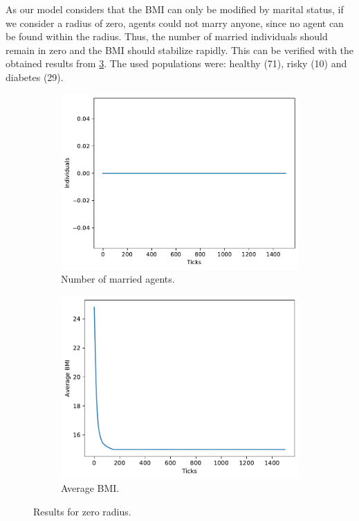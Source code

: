 As our model considers that the BMI can only be modified by marital status, if we consider a radius of zero, agents could not marry anyone, since no agent can be found within the radius. Thus, the number of married individuals should remain in zero and the BMI should stabilize rapidly. This can be verified with the obtained results from \cref{fig:rad0}. The used populations were: healthy (71), risky (10) and diabetes (29).
\begin{figure}[H]
        \centering
        \begin{subfigure}[b]{0.3\columnwidth}
            \centering
            \includegraphics[width=1\columnwidth]{files/radius-0-married.pdf}
            \caption{Number of married agents.}
            \label{subfig:control}
        \end{subfigure} 
        \begin{subfigure}[b]{0.3\columnwidth}
            \centering 
            \includegraphics[width=1\columnwidth]{files/radius-0-bmi.pdf}
            \caption{Average BMI.}
            \label{subfig:sol}
        \end{subfigure}
        \caption{Results for zero radius.}
        \label{fig:rad0}
	\end{figure}
	

